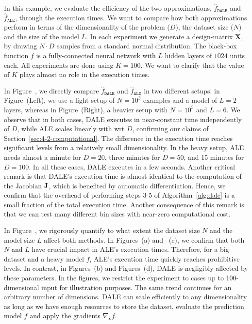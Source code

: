 \documentclass[wcp]{jmlr}
\newcommand{\dale}{\hat{f}_{\mathtt{DALE}}}
\newcommand{\xb}{\mathbf{x}} \newcommand{\R}{\mathbb{R}}
\begin{document}
In this example, we evaluate the efficiency of the two approximations, \(\dale\) and \(\hat{f}_{\mathtt{ALE}}\), through the execution times. We want to compare how both approximations perform in terms of the dimensionality of the problem (\(D\)), the dataset size (\(N\)) and the size of the model \(L\). In each experiment we generate a design-matrix \( \mathbf{X} \), by drawing \( N \cdot D \) samples from a standard normal distribution. The black-box function \(f \) is a fully-connected neural network with \(L\) hidden layers of \( 1024 \) units each. All experiments are done using \(K=100\). We want to clarify that the value of \(K\) plays almost no role in the execution times.

In Figure~, we directly compare \(\dale\) and \(\hat{f}_{\mathtt{ALE}}\) in two different setups: in Figure~(Left), we use a light setup of \(N=10^3\) examples and a model of \(L=2\) layers, whereas in Figure~(Right), a heavier setup with \(N=10^5\) and \(L=6\). We observe that in both cases, DALE executes in near-constant time independently of \(D\), while ALE scales linearly with wrt \(D\), confirming our claims of Section~\ref{sec:4-2-computational}. The difference in the execution time reaches significant levels from a relatively small dimensionality. In the heavy setup, ALE needs almost a minute for \(D=20\), three minutes for \(D=50\), and 15 minutes for \(D=100\). In all these cases, DALE executes in a few seconds. Another critical remark is that DALE's execution time is almost identical to the computation of the Jacobian \( \mathbf{J} \), which is benefited by automatic differentiation. Hence, we confirm that the overhead of performing steps 3-5 of Algorithm~\ref{alg:dale} is a small fraction of the total execution time. Another consequence of this remark is that we can test many different bin sizes with near-zero computational cost.

In Figure~, we rigorously quantify to what extent the dataset size \(N\) and the model size \(L\) affect both methods. In Figures~(a) and ~(c), we confirm that both \(N\) and \(L\) have crucial impact in ALE's execution times. Therefore, for a big dataset and a heavy model \(f\), ALE's execution time quickly reaches prohibitive levels. In contrast, in Figures~(b) and Figures~(d), DALE is negligibly affected by these parameters. In the figures, we restrict the experiment to cases up to 100-dimensional input for illustration purposes. The same trend continues for an arbitrary number of dimensions. DALE can scale efficiently to any dimensionality as long as we have enough resources to store the dataset, evaluate the prediction model \(f\) and apply the gradients \(\nabla_{\xb}f\).
\end{document}
